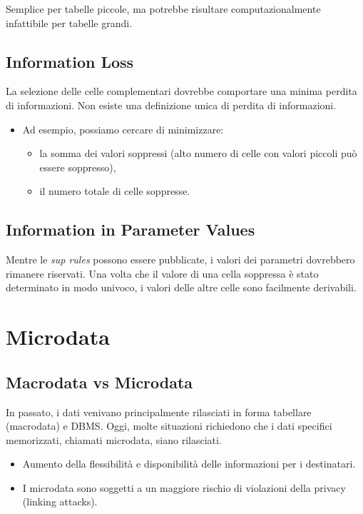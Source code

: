 \documentclass{report}
\begin{document}
\noindent Semplice per tabelle piccole, ma potrebbe risultare computazionalmente infattibile per tabelle grandi.

\subsection{Information Loss}
La selezione delle celle complementari dovrebbe comportare una minima perdita di informazioni. 
Non esiste una definizione unica di perdita di informazioni.
\begin{itemize}
    \item Ad esempio, possiamo cercare di minimizzare:
    \begin{itemize}
        \item la somma dei valori soppressi (alto numero di celle con valori piccoli può essere soppresso),
        \item il numero totale di celle soppresse.
    \end{itemize}
\end{itemize}

\subsection{Information in Parameter Values}
Mentre le \textit{sup rules} possono essere pubblicate, i valori dei parametri dovrebbero rimanere riservati. 
Una volta che il valore di una cella soppressa è stato determinato in modo univoco, i valori delle altre celle sono facilmente derivabili.

\section{Microdata}

\subsection{Macrodata vs Microdata}
In passato, i dati venivano principalmente rilasciati in forma tabellare (macrodata) e DBMS. 
Oggi, molte situazioni richiedono che i dati specifici memorizzati, chiamati microdata, siano rilasciati. 

\begin{itemize}
    \item Aumento della flessibilità e disponibilità delle informazioni per i destinatari.
    \item I microdata sono soggetti a un maggiore rischio di violazioni della privacy (linking attacks).
\end{itemize}
\end{document}
